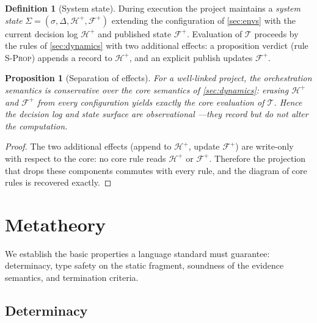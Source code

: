 \documentclass[11pt,a4paper]{article}
\theoremstyle{plain}
\newtheorem{proposition}[theorem]{Proposition}
\theoremstyle{definition}
\newtheorem{definition}[theorem]{Definition}
\theoremstyle{remark}
\newcommand{\rn}[1]{\textsc{#1}}                          %
\newcommand{\env}{\sigma}
\begin{document}
\begin{definition}[System state]
\label{def:sysstate}
During execution the project maintains a \emph{system state}
$\Sigma=(\env,\Delta,\mathcal{H}^{+},\mathcal{F}^{+})$ extending the
configuration of \cref{sec:envs} with the current decision log
$\mathcal{H}^{+}$ and published state $\mathcal{F}^{+}$. Evaluation of
$\mathcal{T}$ proceeds by the rules of \cref{sec:dynamics} with two additional
effects: a proposition verdict (rule \rn{S-Prop}) appends a record to
$\mathcal{H}^{+}$, and an explicit publish updates $\mathcal{F}^{+}$.
\end{definition}

\begin{proposition}[Separation of effects]
\label{prop:separation}
For a well-linked project, the orchestration semantics is conservative over the
core semantics of \cref{sec:dynamics}: erasing $\mathcal{H}^{+}$ and
$\mathcal{F}^{+}$ from every configuration yields exactly the core evaluation of
$\mathcal{T}$. Hence the decision log and state surface are \emph{observational}
---they record but do not alter the computation.
\end{proposition}
\begin{proof}
The two additional effects (append to $\mathcal{H}^{+}$, update
$\mathcal{F}^{+}$) are write-only with respect to the core: no core rule reads
$\mathcal{H}^{+}$ or $\mathcal{F}^{+}$. Therefore the projection that drops
these components commutes with every rule, and the diagram of core rules is
recovered exactly.
\end{proof}

\section{Metatheory}
\label{sec:meta}

We establish the basic properties a language standard must guarantee:
determinacy, type safety on the static fragment, soundness of the evidence
semantics, and termination criteria.

\subsection{Determinacy}
\end{document}
